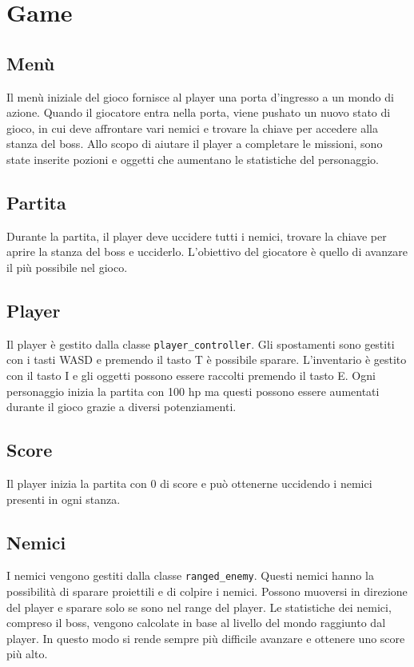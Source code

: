 \documentclass{article}
\begin{document}
\section{Game}

\subsection{Menù}
Il menù iniziale del gioco fornisce al player una porta d'ingresso a un mondo di azione. Quando il giocatore entra nella porta, viene pushato un nuovo stato di gioco, in cui deve affrontare vari nemici e trovare la chiave per accedere alla stanza del boss. Allo scopo di aiutare il player a completare le missioni, sono state inserite pozioni e oggetti che aumentano le statistiche del personaggio.

\subsection{Partita}
Durante la partita, il player deve uccidere tutti i nemici, trovare la chiave per aprire la stanza del boss e ucciderlo. 
L'obiettivo del giocatore è quello di avanzare il più possibile nel gioco.

\subsection{Player}
Il player è gestito dalla classe \verb|player_controller|. Gli spostamenti sono gestiti con i tasti WASD e premendo il tasto T è possibile sparare. L'inventario è gestito con il tasto I e gli oggetti possono essere raccolti premendo il tasto E. Ogni personaggio inizia la partita con 100 hp ma questi possono essere aumentati durante il gioco grazie a diversi potenziamenti.

 \subsection{Score}
 Il player inizia la partita con 0 di score e può ottenerne uccidendo i nemici presenti in ogni stanza.
\subsection{Nemici}
I nemici vengono gestiti dalla classe \verb|ranged_enemy|.
Questi nemici hanno la possibilità di sparare proiettili e di colpire i nemici. 
Possono muoversi in direzione del player e sparare solo se sono nel range del player.
Le statistiche dei nemici, compreso il boss, vengono calcolate in base al livello del mondo raggiunto dal player. In questo modo si rende sempre più difficile avanzare e ottenere uno score più alto.
\end{document}

